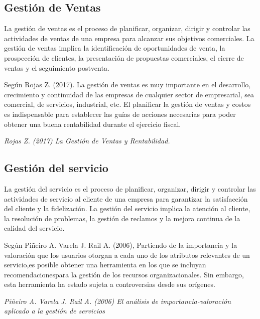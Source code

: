 \documentclass{article}
\newenvironment{marcoTeorico}{}{}
\begin{document}
\begin{marcoTeorico}
  \subsection{Gestión de Ventas}

  La gestión de ventas es el proceso de planificar, organizar, dirigir y controlar las actividades de ventas de una empresa para alcanzar sus objetivos comerciales. La gestión de ventas implica la identificación de oportunidades de venta, la prospección de clientes, la presentación de propuestas comerciales, el cierre de ventas y el seguimiento postventa.

  Según Rojas Z. (2017). La gestión de ventas es muy importante en el desarrollo, crecimiento y continuidad de
  las empresas de cualquier sector de empresarial, sea comercial, de servicios, industrial,
  etc. El planificar la gestión de ventas y costos es indispensable para establecer las guías
  de acciones necesarias para poder obtener una buena rentabilidad durante el ejercicio
  fiscal.

  \begin{flushright}
    \textit{  Rojas Z. (2017) La Gestión de Ventas y Rentabilidad.}
  \end{flushright}

  \subsection{Gestión del servicio}

  La gestión del servicio es el proceso de planificar, organizar, dirigir y controlar las actividades de servicio al cliente de una empresa para garantizar la satisfacción del cliente y la fidelización. La gestión del servicio implica la atención al cliente, la resolución de problemas, la gestión de reclamos y la mejora continua de la calidad del servicio.

  Según  Piñeiro A. Varela J. Rail A. (2006), Partiendo de la importancia y la valoración que los usuarios otorgan a cada uno de los atributos relevantes de un servicio,es posible obtener una herramienta en los que se incluyan recomendacionespara la gestión de los recursos organizacionales. Sin embargo, esta herramienta ha estado sujeta a controversias desde sus orígenes.

  \begin{flushright}
    \textit{ Piñeiro A. Varela J. Rail A. (2006) El análisis de importancia-valoración aplicado a la gestión de servicios}
  \end{flushright}


\end{marcoTeorico}
\end{document}
